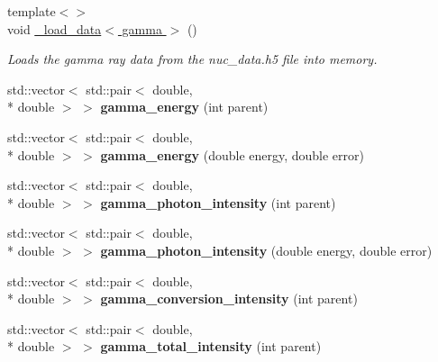 \begin{DoxyCompactItemize}
\item 
\hypertarget{namespacepyne_af3c61532d2b2c56c5f2a0c1c2777b541}{{\footnotesize template$<$$>$ }\\void \hyperlink{namespacepyne_af3c61532d2b2c56c5f2a0c1c2777b541}{\-\_\-load\-\_\-data$<$ gamma $>$} ()}\label{namespacepyne_af3c61532d2b2c56c5f2a0c1c2777b541}

\begin{DoxyCompactList}\small\item\em Loads the gamma ray data from the nuc\-\_\-data.\-h5 file into memory. \end{DoxyCompactList}\item 
\hypertarget{namespacepyne_a06f0af84c68fa27a8c2b091f1018fbf7}{std\-::vector$<$ std\-::pair$<$ double, \\*
double $>$ $>$ {\bfseries gamma\-\_\-energy} (int parent)}\label{namespacepyne_a06f0af84c68fa27a8c2b091f1018fbf7}

\item 
\hypertarget{namespacepyne_ae9c513347dbf555ae036671b9e606ff3}{std\-::vector$<$ std\-::pair$<$ double, \\*
double $>$ $>$ {\bfseries gamma\-\_\-energy} (double energy, double error)}\label{namespacepyne_ae9c513347dbf555ae036671b9e606ff3}

\item 
\hypertarget{namespacepyne_af6550cdd1953ef1b6765c756cb8dbd8a}{std\-::vector$<$ std\-::pair$<$ double, \\*
double $>$ $>$ {\bfseries gamma\-\_\-photon\-\_\-intensity} (int parent)}\label{namespacepyne_af6550cdd1953ef1b6765c756cb8dbd8a}

\item 
\hypertarget{namespacepyne_aed619424ed24f8e57b0cd1adf5e3cd5e}{std\-::vector$<$ std\-::pair$<$ double, \\*
double $>$ $>$ {\bfseries gamma\-\_\-photon\-\_\-intensity} (double energy, double error)}\label{namespacepyne_aed619424ed24f8e57b0cd1adf5e3cd5e}

\item 
\hypertarget{namespacepyne_aecfb315cfddf396d32d23b0cc5cc1958}{std\-::vector$<$ std\-::pair$<$ double, \\*
double $>$ $>$ {\bfseries gamma\-\_\-conversion\-\_\-intensity} (int parent)}\label{namespacepyne_aecfb315cfddf396d32d23b0cc5cc1958}

\item 
\hypertarget{namespacepyne_af27fabc2e6cae361e977993a84c67ac2}{std\-::vector$<$ std\-::pair$<$ double, \\*
double $>$ $>$ {\bfseries gamma\-\_\-total\-\_\-intensity} (int parent)}\label{namespacepyne_af27fabc2e6cae361e977993a84c67ac2}


\end{DoxyCompactItemize}
